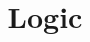 \documentclass{article}
\begin{document}
\title{Logic}
\maketitle



%    
%    
%    
%    
%    
\end{document}
